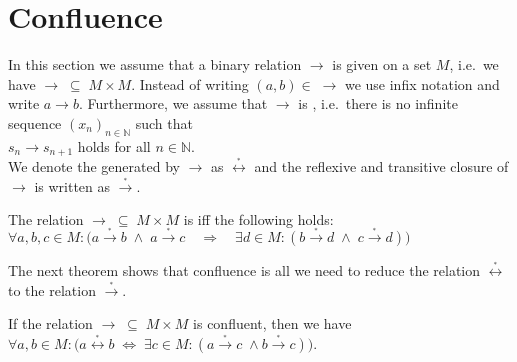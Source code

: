 \section{Confluence}
In this section we assume that a binary relation $\rightarrow$ is given on a set $M$, i.e.~we have
$\rightarrow \;\subseteq\; M \times M$.  Instead of writing $(a, b) \in\; \rightarrow$ we use infix notation and write
$a \rightarrow b$.  Furthermore, we assume that $\rightarrow$ is ,
i.e.~there is no infinite sequence $(x_n)_{n\in\mathbb{N}}$ such that
\\[0.2cm]
\hspace*{1.3cm}
$s_n \rightarrow s_{n+1}$ \quad holds for all $n\in\mathbb{N}$.
\\[0.2cm]
We denote the  generated by $\rightarrow$ as $\stackrel{_*}{\leftrightarrow}$ and the reflexive and
transitive closure of $\rightarrow$ is written as $\stackrel{_*}{\rightarrow}$.

\begin{Definition}[Confluence] 
  The relation $\rightarrow \;\subseteq\; M \times M$ is  iff the following holds:
  \\[0.2cm]
  \hspace*{1.3cm}
  $\forall a, b, c \in M: \bigl(a \stackrel{_*}{\rightarrow} b \;\wedge\; a \stackrel{_*}{\rightarrow}c \quad\Rightarrow\quad
   \exists d \in M: (b \stackrel{_*}{\rightarrow} d \;\wedge\; c \stackrel{_*}{\rightarrow} d)\bigr)
  $ \eox
\end{Definition}
The next theorem shows that confluence is all we need to reduce the relation $\stackrel{_*}{\leftrightarrow}$
to the relation $\stackrel{_*}{\rightarrow}$. 

\begin{Theorem}
  If the relation $\rightarrow \;\subseteq\; M \times M$ is confluent, then we have
  \\[0.2cm]
  \hspace*{1.3cm}
  $\forall a, b \in M:\bigl( a \stackrel{_*}{\leftrightarrow} b \;\Leftrightarrow\;
   \exists c \in M: (a \stackrel{_*}{\rightarrow} c \;\wedge b \stackrel{_*}{\rightarrow} c)\bigr)$.
 \end{Theorem}

